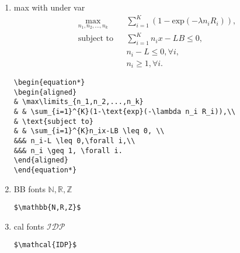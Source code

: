 \begin{enumerate}
\begin{lstlisting}[language=Tex]
\begin{align}
\intertext{For $m=1$,}\\
(A^{1})^{-1}& =(A)^{-1}=(A^{-1})^{1}\\
\intertext{Assume the result holds in the case $m=k$, that is,}\\
(A^{k})^{-1}& =(A^{-1})^{k}\\
\intertext{It follows that}\\
(A^{-1})^{k+1}A^{k+1}& =A^{-1}(A^{-1})^{k}A^{k}A=A^{-1}A=I\\
\intertext{and}\\
A^{k+1}(A^{-1})^{k+1}& =AA^{k}(A^{-1})^{k}A^{-1}=AA^{-1}=I\\
\intertext{Therefore}\\
(A^{-1})^{k+1}& =(A^{k+1})^{-1}
\end{align}
\end{lstlisting}

\item max with under var
\begin{equation*}
\begin{aligned}
& \max\limits_{n_1,n_2,...,n_k}
& & \sum_{i=1}^{K}(1-\text{exp}(-\lambda n_i R_i)),\\
& \text{subject to}
& & \sum_{i=1}^{K}n_ix-LB \leq 0, \\
&&& n_i-L \leq 0,\forall i,\\
&&& n_i \geq 1, \forall i.
\end{aligned}
\end{equation*}

\begin{lstlisting}[language=Tex]
\begin{equation*}
\begin{aligned}
& \max\limits_{n_1,n_2,...,n_k}
& & \sum_{i=1}^{K}(1-\text{exp}(-\lambda n_i R_i)),\\
& \text{subject to}
& & \sum_{i=1}^{K}n_ix-LB \leq 0, \\
&&& n_i-L \leq 0,\forall i,\\
&&& n_i \geq 1, \forall i.
\end{aligned}
\end{equation*}
\end{lstlisting}

\item BB fonts
$\mathbb{N,R,Z}$

\begin{lstlisting}[language=Tex]
$\mathbb{N,R,Z}$
\end{lstlisting}

\item cal fonts
$\mathcal{IDP}$
\begin{lstlisting}[language=Tex]
$\mathcal{IDP}$
\end{lstlisting}
\end{enumerate}
